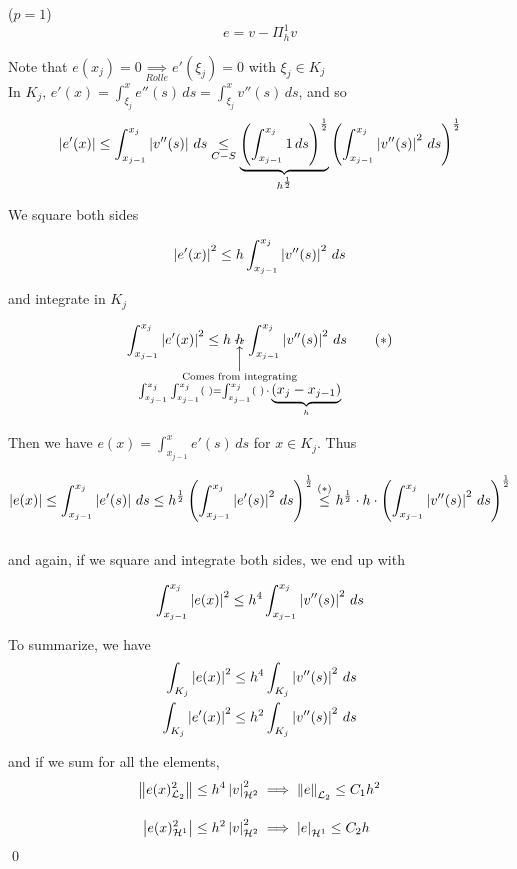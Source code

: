 \begin{demo}
  ($p=1$)\\
  \vspace{-0.5cm}
  $$e=v-\Pi_h^1v$$
  
  Note that $e(x_j) = 0 \underset{Rolle}{\implies} e'(\xi_j)=0$ with $\xi_j \in K_j$\\
  
  In $\displaystyle{K_j,\, e'(x) = \int_{\xi_j}^x e''(s)\,ds = \int_{\xi_j}^x v''(s)\,ds}$, and so
  \[
    \left\vert e'(x) \right\vert \leq \int_{x_{j-1}}^{x_j} \left\vert v''(s) \right\vert\,ds \underset{C-S}{\leq} \underbrace{\left(\int_{x_{j-1}}^{x_j}1\,ds\right)^{\frac{1}{2}}}_{h^{\frac{1}{2}}}\left(\int_{x_{j-1}}^{x_j} \left\vert v''(s) \right\vert^2 \, ds\right)^{\frac{1}{2}}
  \]
  
  We square both sides
  
  \[
    \left\vert e'(x) \right\vert^2 \leq h \int_{x_{j-1}}^{x_j} \left\vert v''(s) \right\vert^2 \, ds
  \]
  
  and integrate in $K_j$
  
  \[
    \int_{x_{j-1}}^{x_j}\abs{e'(x)}^2 \leq h\cdot \hspace{-2.6cm}\underset{\substack{\Big\uparrow \\ \text{Comes from integrating}\\\int_{x_{j-1}}^{x_j}\int_{x_{j-1}}^{x_j}(\,\,) = \int_{x_{j-1}}^{x_j}(\,\,)\,\cdot\,\underbrace{(x_j - x_{j-1})}_{h}}}{h}\hspace{-2.6cm}\cdot \int_{x_{j-1}}^{x_j} \abs{v''(s)}^2 \, ds \tag{$*$}
  \]
  
  Then we have $e(x) = \displaystyle{\int_{x_{j-1}}^x e'(s)\,ds}$ for $x\in K_j$. Thus
  
  \[
    \left\vert e(x) \right\vert \leq \int_{x_{j-1}}^{x_j}\left\vert e'(s) \right\vert\,ds \leq h^{\frac{1}{2}}\left(\int_{x_{j-1}}^{x_j}\left\vert e'(s) \right\vert^2\,ds\right)^{\frac{1}{2}} \overset{(*)}{\leq} h^{\frac{1}{2}}\cdot h \cdot \left(\int_{x_{j-1}}^{x_j}\left\vert v''(s) \right\vert^2\,ds\right)^{\frac{1}{2}}
  \]\-\\
  and again, if we square and integrate both sides, we end up with
  
  \[
    \int_{x_{j-1}}^{x_j}\left\vert e(x) \right\vert^2 \leq h^4\int_{x_{j-1}}^{x_j}\left\vert v''(s) \right\vert^2\,ds
  \]
  
  To summarize, we have
  \begin{align*}
      \int_{K_j}\left\vert e(x) \right\vert^2 &\leq h^4\int_{K_j}\left\vert v''(s) \right\vert^2\,ds\\
      \int_{K_j}\left\vert e'(x) \right\vert^2 &\leq h^2\int_{K_j}\left\vert v''(s) \right\vert^2\,ds
  \end{align*}
  
  and if we sum for all the elements,
  \begin{align*}
      \left\lVert e(x)_{\mathcal{L}_2}^2\right\rVert &\leq h^4\left\vert v \right\vert_{\mathcal{H}^2}^2 \implies \left\lVert e\right\rVert_{\mathcal{L}_2} \leq C_1h^2\\[10pt]
      \left\vert e(x)_{\mathcal{H}^1}^2 \right\vert &\leq h^2\left\vert v \right\vert_{\mathcal{H}^2}^2 \implies \left\vert e \right\vert_{\mathcal{H}^1} \leq C_2h
  \end{align*}
  \qed
\end{demo}

